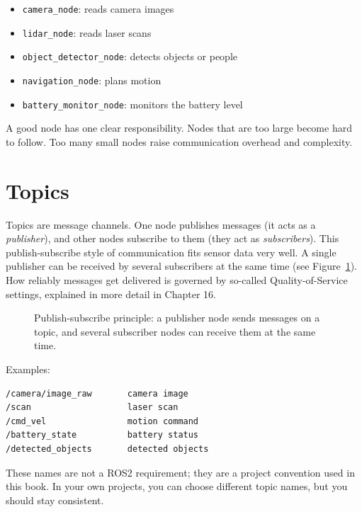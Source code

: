 \begin{itemize}
    \item \texttt{camera\_node}: reads camera images
    \item \texttt{lidar\_node}: reads laser scans
    \item \texttt{object\_detector\_node}: detects objects or people
    \item \texttt{navigation\_node}: plans motion
    \item \texttt{battery\_monitor\_node}: monitors the battery level
\end{itemize}

A good node has one clear responsibility. Nodes that are too large become hard to follow. Too many small nodes raise communication overhead and complexity.

\section{Topics}
Topics are message channels. One node publishes messages (it acts as a \emph{publisher}), and other nodes subscribe to them (they act as \emph{subscribers}). This publish-subscribe style of communication fits sensor data very well. A single publisher can be received by several subscribers at the same time (see Figure~\ref{fig:kap14-publish-subscribe}). How reliably messages get delivered is governed by so-called Quality-of-Service settings, explained in more detail in Chapter 16.

\begin{figure}[H]
  \centering
  \caption{Publish-subscribe principle: a publisher node sends messages on a topic, and several subscriber nodes can receive them at the same time.}
  \label{fig:kap14-publish-subscribe}
\end{figure}

Examples:

\begin{lstlisting}[style=plaintext]
/camera/image_raw       camera image
/scan                   laser scan
/cmd_vel                motion command
/battery_state          battery status
/detected_objects       detected objects
\end{lstlisting}

These names are not a ROS2 requirement; they are a project convention used in this book. In your own projects, you can choose different topic names, but you should stay consistent.

